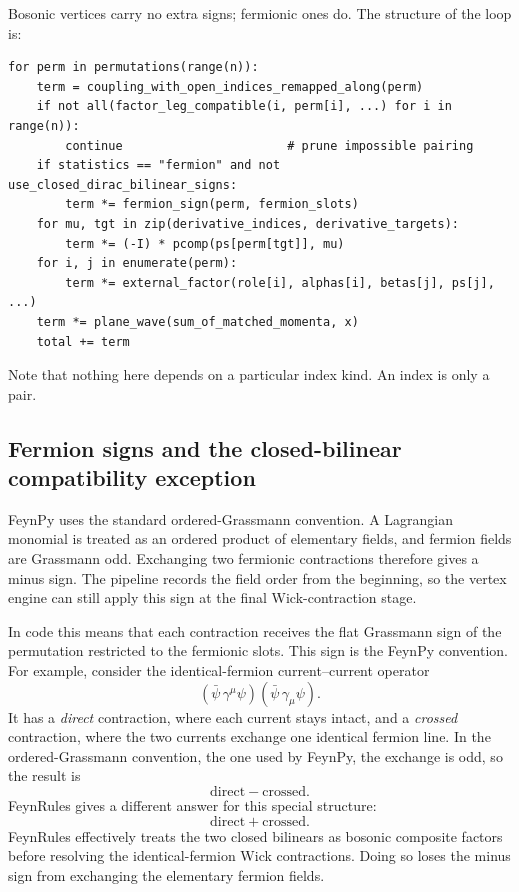 Bosonic vertices carry no extra signs; fermionic ones do. The structure of the loop is:

\begin{verbatim}
for perm in permutations(range(n)):
    term = coupling_with_open_indices_remapped_along(perm)
    if not all(factor_leg_compatible(i, perm[i], ...) for i in range(n)):
        continue                       # prune impossible pairing
    if statistics == "fermion" and not use_closed_dirac_bilinear_signs:
        term *= fermion_sign(perm, fermion_slots)
    for mu, tgt in zip(derivative_indices, derivative_targets):
        term *= (-I) * pcomp(ps[perm[tgt]], mu)
    for i, j in enumerate(perm):
        term *= external_factor(role[i], alphas[i], betas[j], ps[j], ...)
    term *= plane_wave(sum_of_matched_momenta, x)
    total += term
\end{verbatim}

Note that nothing here depends on a particular index kind. An index is only a  pair.

\subsection{Fermion signs and the closed-bilinear compatibility exception}
\label{sec:internals-contraction-fermions}

FeynPy uses the standard ordered-Grassmann convention. A Lagrangian monomial is treated as an ordered product of elementary fields, and fermion fields are Grassmann odd. Exchanging two fermionic contractions therefore gives a minus sign. The pipeline records the field order from the beginning, so the vertex engine can still apply this sign at the final Wick-contraction stage.

In code this means that each contraction receives the flat Grassmann sign of the permutation restricted to the fermionic slots. This sign is the FeynPy convention. For example, consider the identical-fermion current--current operator
\begin{equation}
(\bar\psi\,\gamma^\mu\psi)(\bar\psi\,\gamma_\mu\psi).
\end{equation}
It has a \emph{direct} contraction, where each current stays intact, and a \emph{crossed} contraction, where the two currents exchange one identical fermion line. In the ordered-Grassmann convention, the one used by FeynPy, the exchange is odd, so the result is
\[
\text{direct}-\text{crossed}.
\]
FeynRules gives a different answer for this special structure:
\[
\text{direct}+\text{crossed}.
\]
 FeynRules effectively treats the two closed bilinears as bosonic composite factors before resolving the identical-fermion Wick contractions. Doing so loses the minus sign from exchanging the elementary fermion fields.


